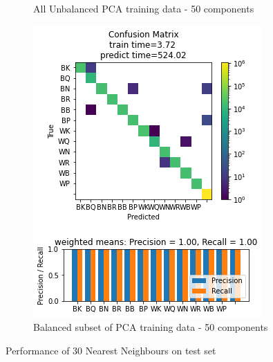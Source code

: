 \documentclass{article}
\newcommand{\FIGLABEL}[1]{Performance of #1 on test set}
\newcommand{\PCAFL}{All Unbalanced PCA training data - 50 components}
\newcommand{\PCABL}{Balanced subset of PCA training data - 50 components}
\begin{document}
\begin{figure}[h]
\begin{subfigure}{0.33\textwidth}
\caption{\PCAFL}
\end{subfigure}
\begin{subfigure}{0.33\textwidth}
\includegraphics[width=0.9\linewidth]{30NN_B_PCA50c_160x160_evaluation.png} 
\caption{\PCABL}
\end{subfigure}
\caption{\FIGLABEL{30 Nearest Neighbours}}
\label{fig:30NN}
\end{figure}
\end{document}
